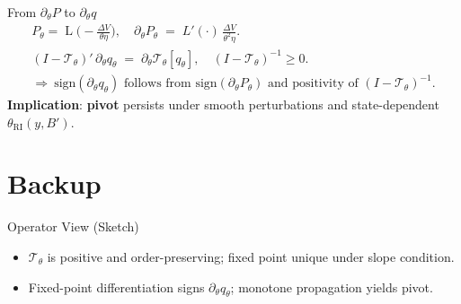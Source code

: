 \documentclass[aspectratio=169,11pt,professionalfonts]{beamer}
\newcommand{\1}{\mathbb{1}}
\DeclareMathOperator{\Lsig}{L}
\begin{document}
\begin{frame}{From $\partial_{\theta} P$ to $\partial_{\theta} q$}
  \begin{gather*}
    P_{\theta}=\Lsig\!\Big(-\tfrac{\Delta V}{\theta\eta}\Big),\quad \partial_{\theta} P_{\theta}\;=\;L'(\cdot)\,\tfrac{\Delta V}{\theta^2\eta}.\\
    (I-\mathcal T_{\theta})'\,\partial_{\theta} q_{\theta}\;=\;\partial_{\theta} \mathcal T_{\theta}[q_{\theta}],\quad (I-\mathcal T_{\theta})^{-1}\ge0.\\
    \Rightarrow\ \mathrm{sign}(\partial_{\theta} q_{\theta}) \text{ follows from } \mathrm{sign}(\partial_{\theta} P_{\theta}) \text{ and positivity of }(I{-}\mathcal T_{\theta})^{-1}.
  \end{gather*}
  \textbf{Implication}: \textbf{pivot} persists under smooth perturbations and state-dependent $\theta_{\mathrm{RI}}(y,B')$.
\end{frame}

\appendix
\section{Backup}

\begin{frame}{Operator View (Sketch)}
  \begin{itemize}
    \item $\mathcal T_{\theta}$ is positive and order-preserving; fixed point unique under slope condition.
    \item Fixed-point differentiation signs $\partial_{\theta} q_{\theta}$; monotone
          propagation yields pivot.
  \end{itemize}
\end{frame}
\end{document}
